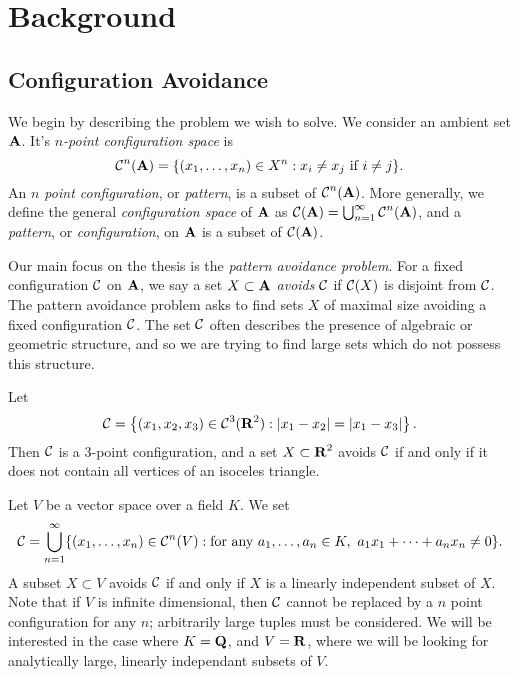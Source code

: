 
\chapter{Background}
\label{ch:Background}

\section{Configuration Avoidance}

We begin by describing the problem we wish to solve. We consider an ambient set $\operatorname{\mathbf{A}}$. It's \emph{$n$-point configuration space} is
%
\[ \operatorname{\mathcal{C}}^n(\operatorname{\mathbf{A}}) = \{ (x_1, \dots, x_n) \in X^n: x_i \neq x_j\ \text{if $i \neq j$} \}. \]
%
An \emph{$n$ point configuration}, or \emph{pattern}, is a subset of $\operatorname{\mathcal{C}}^n(\operatorname{\mathbf{A}})$. More generally, we define the general \emph{configuration space} of $\operatorname{\mathbf{A}}$ as $\operatorname{\mathcal{C}}(\operatorname{\mathbf{A}}) = \bigcup_{n = 1}^\infty \operatorname{\mathcal{C}}^n(\operatorname{\mathbf{A}})$, and a \emph{pattern}, or \emph{configuration}, on $\operatorname{\mathbf{A}}$ is a subset of $\operatorname{\mathcal{C}}(\operatorname{\mathbf{A}})$.

Our main focus on the thesis is the \emph{pattern avoidance problem}. For a fixed configuration $\operatorname{\mathcal{C}}$ on $\operatorname{\mathbf{A}}$, we say a set $X \subset \operatorname{\mathbf{A}}$ \emph{avoids} $\operatorname{\mathcal{C}}$ if $\operatorname{\mathcal{C}}(X)$ is disjoint from $\operatorname{\mathcal{C}}$. The pattern avoidance problem asks to find sets $X$ of maximal size avoiding a fixed configuration $\operatorname{\mathcal{C}}$. The set $\operatorname{\mathcal{C}}$ often describes the presence of algebraic or geometric structure, and so we are trying to find large sets which do not possess this structure.

\begin{example}
	Let
	\[ \operatorname{\mathcal{C}} = \left\{ (x_1, x_2, x_3) \in \operatorname{\mathcal{C}}^3(\operatorname{\mathbf{R}}^2) : |x_1-x_2| = |x_1-x_3| \right\}. \]
	Then $\operatorname{\mathcal{C}}$ is a 3-point configuration, and a set $X \subset \operatorname{\mathbf{R}}^2$ avoids $\operatorname{\mathcal{C}}$ if and only if it does not contain all vertices of an isoceles triangle. %
\end{example}

\begin{example}
	Let $V$ be a vector space over a field $K$. We set
	\[ \operatorname{\mathcal{C}} = \bigcup_{n = 1}^\infty \{ (x_1, \dots, x_n) \in \operatorname{\mathcal{C}}^n(V): \text{for any}\ a_1, \dots, a_n \in K,\ a_1x_1 + \dots + a_nx_n \neq 0 \}. \]
	A subset $X \subset V$ avoids $\operatorname{\mathcal{C}}$ if and only if $X$ is a linearly independent subset of $X$. Note that if $V$ is infinite dimensional, then $\operatorname{\mathcal{C}}$ cannot be replaced by a $n$ point configuration for any $n$; arbitrarily large tuples must be considered. We will be interested in the case where $K = \operatorname{\mathbf{Q}}$, and $V = \operatorname{\mathbf{R}}$, where we will be looking for analytically large, linearly independant subsets of $V$.
\end{example}

